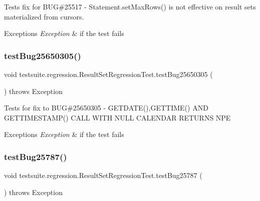Tests fix for B\+UG\#25517 -\/ Statement.\+set\+Max\+Rows() is not effective on result sets materialized from cursors.


\begin{DoxyExceptions}{Exceptions}
{\em Exception} & if the test fails \\
\hline
\end{DoxyExceptions}
\mbox{\label{classtestsuite_1_1regression_1_1_result_set_regression_test_a0f5956c737c57829a292e224381bffb6}} 
\subsubsection{\texorpdfstring{test\+Bug25650305()}{testBug25650305()}}
{\footnotesize\ttfamily void testsuite.\+regression.\+Result\+Set\+Regression\+Test.\+test\+Bug25650305 (\begin{DoxyParamCaption}{ }\end{DoxyParamCaption}) throws Exception}

Tests for fix to B\+UG\#25650305 -\/ G\+E\+T\+D\+A\+T\+E(),G\+E\+T\+T\+I\+M\+E() A\+ND G\+E\+T\+T\+I\+M\+E\+S\+T\+A\+M\+P() C\+A\+LL W\+I\+TH N\+U\+LL C\+A\+L\+E\+N\+D\+AR R\+E\+T\+U\+R\+NS N\+PE


\begin{DoxyExceptions}{Exceptions}
{\em Exception} & if the test fails \\
\hline
\end{DoxyExceptions}
\mbox{\label{classtestsuite_1_1regression_1_1_result_set_regression_test_ac301a606f76010d277f5daf49e296b01}} 
\subsubsection{\texorpdfstring{test\+Bug25787()}{testBug25787()}}
{\footnotesize\ttfamily void testsuite.\+regression.\+Result\+Set\+Regression\+Test.\+test\+Bug25787 (\begin{DoxyParamCaption}{ }\end{DoxyParamCaption}) throws Exception}

